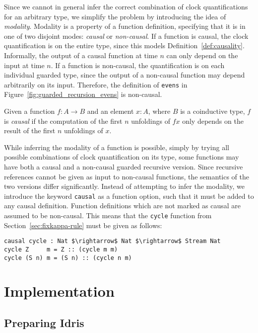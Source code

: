 Since we cannot in general infer the correct combination of clock
quantifications for an arbitrary type, we simplify the problem by introducing
the idea of \emph{modality}. Modality is a property of a function definition,
specifying that it is in one of two disjoint modes: \emph{causal} or
\emph{non-causal}. If a function is causal, the clock quantification is on the
entire type, since this models Definition~\ref{def:causality}. Informally, the
output of a causal function at time $n$ can only depend on the input at time
$n$. If a function is non-causal, the quantification is on each individual
guarded type, since the output of a non-causal function may depend arbitrarily
on its input. Therefore, the definition of \texttt{evens} in
Figure~\ref{fig:guarded_recursion_evens} is non-causal.

\begin{definition}
\label{def:causality}
  Given a function $f : A \to B$ and an element $x : A$, where $B$ is a
  coinductive type, $f$ is \emph{causal} if the computation of the first $n$
  unfoldings of $f x$ only depends on the result of the first $n$ unfoldings of $x$.
\end{definition}

While inferring the modality of a function is possible, simply by trying all
possible combinations of clock quantification on its type, some functions may
have both a causal and a non-causal guarded recursive version. Since recursive
references cannot be given as input to non-causal functions, the semantics of
the two versions differ significantly. Instead of attempting to infer the
modality, we introduce the keyword \texttt{causal} as a function option, such
that it must be added to any causal definition. Function definitions which are
not marked as causal are assumed to be non-causal. This means that the
\texttt{cycle} function from Section~\ref{sec:fixkappa-rule} must be given as
follows:
\begin{lstlisting}[mathescape]
causal cycle : Nat $\rightarrow$ Nat $\rightarrow$ Stream Nat
cycle Z     m = Z :: (cycle m m)
cycle (S n) m = (S n) :: (cycle n m)
\end{lstlisting}


\section{Implementation}
\subsection{Preparing Idris}

